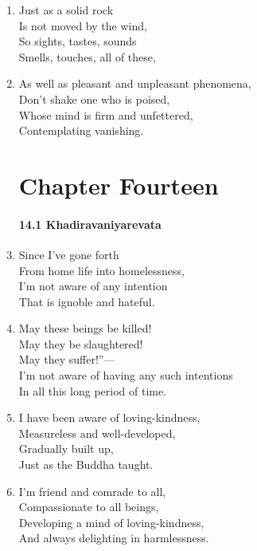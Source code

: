\documentclass[10pt, openany]{book}
\newcommand*{\vleftofline}[1]{\leavevmode\llap{#1}}
\begin{document}
\begin{enumerate}
\item Just as a solid rock\\
Is not moved by the wind,\\
So sights, tastes, sounds\\
Smells, touches, all of these,

\item As well as pleasant and unpleasant phenomena,\\
Don’t shake one who is poised,\\
Whose mind is firm and unfettered,\\
Contemplating vanishing.

\chapter*{Chapter Fourteen}

\subsubsection*{14.1 Khadiravaniyarevata}

\item Since I’ve gone forth\\
From home life into homelessness,\\
I’m not aware of any intention\\
That is ignoble and hateful.

\item \vleftofline{“}May these beings be killed! \\
May they be slaughtered!\\
May they suffer!”—\\
I’m not aware of having any such intentions\\
In all this long period of time.

\item I have been aware of loving-kindness,\\
Measureless and well-developed,\\
Gradually built up,\\
Just as the Buddha taught.

\item I’m friend and comrade to all,\\
Compassionate to all beings,\\
Developing a mind of loving-kindness,\\
And always delighting in harmlessness.


\end{enumerate}
\end{document}
